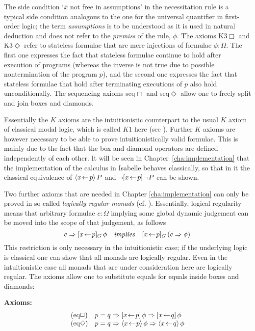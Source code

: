 The side condition `$\bar x$ not free in assumptions' in the necessitation rule
is a typical side condition analogous to the one for the universal quantifier in
first-order logic; the term \emph{assumptions} is to be understood as it is used
in natural deduction and does not refer to the \emph{premiss} of the rule, $\phi$.
The axioms K3$\Box$ and K3$\Diamond$ refer to stateless formulae that are mere
injections of formulae $\phi : \Omega$. The first one expresses the fact that stateless
formulae continue to hold after execution of programs (whereas the inverse is
not true due to possible nontermination of the program $p$), and the second one
expresses the fact that stateless formulae that hold after terminating
executions of $p$ also hold unconditionally. The sequencing axioms seq$\Box$ and
seq$\Diamond$ allow one to freely split and join boxes and diamonds. 

Essentially the $K$ axioms are the intuitionistic counterpart to the usual $K$
axiom of classical modal logic, which is called $K1$ here (see
\cite{Simpson94}). Further $K$ axioms are however necessary to be able to prove
intuitionistically valid formulae. This is mainly due to the fact that the box
and diamond operators are defined independently of each other. It will be seen
in Chapter~\ref{cha:implementation} that the implementation of the calculus in
Isabelle behaves classically, so that in it the classical equivalence of
$\langle x\!\gets\! p\rangle\,{P}$ and $\lnot[x\!\gets\! p]\,{\lnot P}$ can be shown.


Two further axioms that are needed in Chapter \ref{cha:implementation} can only
be proved in so called \emph{logically regular monads} (cf. \cite[Def.
5.14]{SchroederMossakowski:PDL}). Essentially, logical regularity means that
arbitrary formulae $c : \Omega$ implying some global dynamic judgement can be moved
into the scope of that judgement, as follows
\[
  c \Rightarrow [x\!\gets\! p]_G\,\phi \quad\mathit{implies}\quad 
  [x\!\gets\! p]_G\,(c \Rightarrow \phi)
\]
This restriction is only necessary in the intuitionistic case; if the underlying
logic is classical one can show that all monads are logically
regular. Even in the intuitionistic case all monads that are under consideration
here are logically regular. The axioms allow one to substitute equals for equals
inside boxes and diamonds:

\vspace{1.5ex} \noindent  \textbf{Axioms:}
  \begin{displaymath}
    \begin{array}{lll}
      \textrm{(eq$\Box$)} & p = q \Rightarrow \PDLBox{x\leteq p}{\phi} \Rightarrow \PDLBox{x\leteq q}{\phi}\\
      \textrm{(eq$\Diamond$)} & p = q \Rightarrow \PDLDmd{x\leteq p}{\phi} \Rightarrow \PDLDmd{x\leteq q}{\phi}
    \end{array}
  \end{displaymath}

